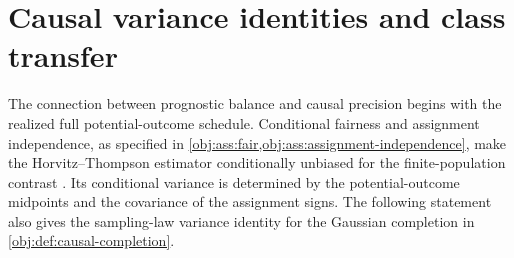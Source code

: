 \section{Causal variance identities and class transfer}

The connection between prognostic balance and causal precision begins with the realized full potential-outcome schedule. Conditional fairness and assignment independence, as specified in \cref{obj:ass:fair,obj:ass:assignment-independence}, make the Horvitz--Thompson estimator conditionally unbiased for the finite-population contrast \citep{Horvitz1952}. Its conditional variance is determined by the potential-outcome midpoints and the covariance of the assignment signs. The following statement also gives the sampling-law variance identity for the Gaussian completion in \cref{obj:def:causal-completion}.

